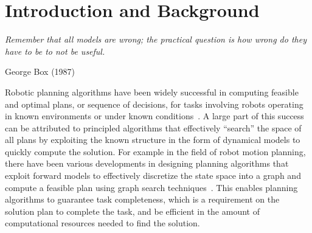 
\chapter{Introduction and Background}
\label{cha:introduction}

\epigraph{\textit{Remember that all models are wrong; the practical
    question is how wrong do they have to be to not be
    useful.}}{George Box (1987)}


Robotic planning algorithms have been widely successful in computing
feasible and optimal plans, or sequence of decisions, for tasks
involving robots operating in known environments or under known
conditions~\cite{DBLP:books/cu/L2006}. A large part of this success
can be attributed to principled algorithms that effectively
``search'' the space of all plans by exploiting the known
structure in the form of dynamical models to quickly compute the
solution. For example in the field of robot motion planning, there
have been various developments in designing planning algorithms that
exploit forward models to effectively discretize the state space into
a graph and compute a feasible plan using graph search
techniques~\cite{DBLP:books/daglib/0068760}. This enables planning
algorithms to guarantee task 
completeness, which is a requirement on the solution plan to complete
the task, and be efficient in the amount of computational resources
needed to find the solution.

